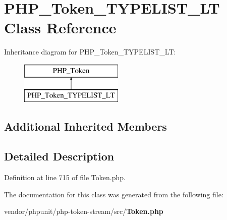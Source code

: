 \section{P\+H\+P\+\_\+\+Token\+\_\+\+T\+Y\+P\+E\+L\+I\+S\+T\+\_\+\+L\+T Class Reference}
\label{class_p_h_p___token___t_y_p_e_l_i_s_t___l_t}
Inheritance diagram for P\+H\+P\+\_\+\+Token\+\_\+\+T\+Y\+P\+E\+L\+I\+S\+T\+\_\+\+L\+T\+:\begin{figure}[H]
\begin{center}
\leavevmode
\includegraphics[height=2.000000cm]{class_p_h_p___token___t_y_p_e_l_i_s_t___l_t}
\end{center}
\end{figure}
\subsection*{Additional Inherited Members}


\subsection{Detailed Description}


Definition at line 715 of file Token.\+php.



The documentation for this class was generated from the following file\+:\begin{DoxyCompactItemize}
\item 
vendor/phpunit/php-\/token-\/stream/src/{\bf Token.\+php}\end{DoxyCompactItemize}
